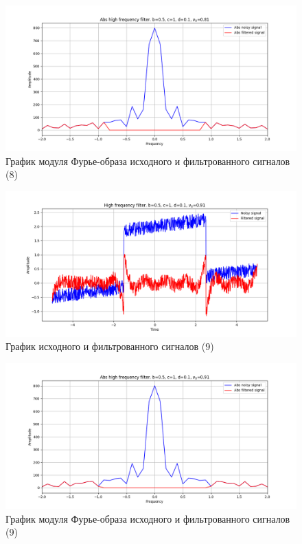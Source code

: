 \documentclass[a4paper, 12pt]{article}
\begin{document}
    \begin{figure}[!htb]
        \centering
        \includegraphics[scale=0.48]{8_abs_u_U_nolow.png}
        \captionsetup{skip=0pt}
        \caption{График модуля Фурье-образа исходного и фильтрованного сигналов (8)}
        \label{fig:fig42}
    \end{figure}
    \begin{figure}[!htb]
        \centering
        \includegraphics[scale=0.48]{9_u_flt_u_nolow.png}
        \captionsetup{skip=0pt}
        \caption{График исходного и фильтрованного сигналов (9)}
        \label{fig:fig43}
    \end{figure}
    \newpage
    \begin{figure}[!htb]
        \centering
        \includegraphics[scale=0.48]{9_abs_u_U_nolow.png}
        \captionsetup{skip=0pt}
        \caption{График модуля Фурье-образа исходного и фильтрованного сигналов (9)}
        \label{fig:fig44}
    \end{figure}
\end{document}
